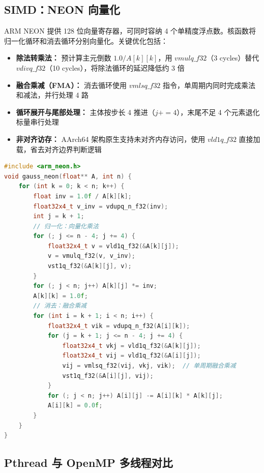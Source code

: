 \documentclass[a4paper]{article}
\begin{document}
\subsection{SIMD：NEON 向量化}

ARM NEON 提供 128 位向量寄存器，可同时容纳 4 个单精度浮点数。核函数将归一化循环和消去循环分别向量化。关键优化包括：

\begin{itemize}
    \item \textbf{除法转乘法：} 预计算主元倒数 $1.0/A[k][k]$，用 $vmulq\_f32$（3 cycles）替代 $vdivq\_f32$（10 cycles），将除法循环的延迟降低约 3 倍
    \item \textbf{融合乘减（FMA）：} 消去循环使用 $vmlsq\_f32$ 指令，单周期内同时完成乘法和减法，并行处理 4 路
    \item \textbf{循环展开与尾部处理：} 主体按步长 4 推进（$j += 4$），末尾不足 4 个元素退化标量串行处理
    \item \textbf{非对齐访存：} AArch64 架构原生支持未对齐内存访问，使用 $vld1q\_f32$ 直接加载，省去对齐边界判断逻辑
\end{itemize}

\begin{lstlisting}[title=NEON 向量化核心代码,frame=trbl,language={C++}]
#include <arm_neon.h>
void gauss_neon(float** A, int n) {
    for (int k = 0; k < n; k++) {
        float inv = 1.0f / A[k][k];
        float32x4_t v_inv = vdupq_n_f32(inv);
        int j = k + 1;
        // 归一化：向量化乘法
        for (; j <= n - 4; j += 4) {
            float32x4_t v = vld1q_f32(&A[k][j]);
            v = vmulq_f32(v, v_inv);
            vst1q_f32(&A[k][j], v);
        }
        for (; j < n; j++) A[k][j] *= inv;
        A[k][k] = 1.0f;
        // 消去：融合乘减
        for (int i = k + 1; i < n; i++) {
            float32x4_t vik = vdupq_n_f32(A[i][k]);
            for (j = k + 1; j <= n - 4; j += 4) {
                float32x4_t vkj = vld1q_f32(&A[k][j]);
                float32x4_t vij = vld1q_f32(&A[i][j]);
                vij = vmlsq_f32(vij, vkj, vik);  // 单周期融合乘减
                vst1q_f32(&A[i][j], vij);
            }
            for (; j < n; j++) A[i][j] -= A[i][k] * A[k][j];
            A[i][k] = 0.0f;
        }
    }
}
\end{lstlisting}

\subsection{Pthread 与 OpenMP 多线程对比}
\end{document}
